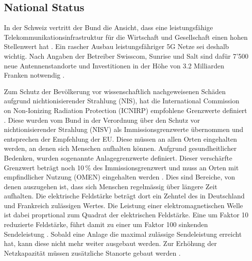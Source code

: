 \subsection{National Status}
\begin{German}
    In der Schweiz vertritt der Bund die Ansicht, dass eine leistungsfähige Telekommunikationsinfrastruktur für die Wirtschaft und Gesellschaft einen hohen Stellenwert hat \cite{bundesratNachhaltigesMobilfunknetzBericht2022}. Ein rascher Ausbau leistungsfähriger 5G Netze sei deshalb wichtig. Nach Angaben der Betreiber Swisscom, Sunrise und Salt sind dafür 7'500 neue Antennenstandorte und Investitionen in der Höhe von 3.2 Milliarden Franken notwendig \cite{bundesratNachhaltigesMobilfunknetzBericht2022}.

    Zum Schutz der Bevölkerung vor wissenschaftlich nachgeweisenen Schäden aufgrund nichtionisierender Strahlung (NIS), hat die International Commission on Non-Ionizing Radiation Protection (ICNIRP) empfohlene Grenzwerte definiert \cite{baumannMitVerordnungUeber2005}. Diese wurden vom Bund in der Verordnung über den Schutz vor nichtionisierender Strahlung (NISV) als Immissionsgrenzwerte übernommen und entsprechen der Empfehlung der EU. Diese müssen an allen Orten eingehalten werden, an denen sich Menschen aufhalten können. Aufgrund gesundheitlicher Bedenken, wurden sogenannte Anlagegrenzwerte definiert. Dieser verschärfte Grenzwert beträgt noch 10\,\% des Immissionsgrenzwert und muss an Orten mit empfindlicher Nutzung (OMEN) eingehalten werden \cite{baumannMitVerordnungUeber2005}. Dies sind Bereiche, von denen auszugehen ist, dass sich Menschen regelmässig über längere Zeit aufhalten. Die elektrische Feldstärke beträgt dort ein Zehntel des in Deutschland und Frankreich zulässigen Wertes. Die Leistung einer elektromagnetischen Welle ist dabei proprtional zum Quadrat der elektrischen Feldstärke. Eine um Faktor 10 reduzierte Feldstärke, führt damit zu einer um Faktor 100 sinkenden Sendeleistung \cite{chance5gAnlagegrenzwerteImMobilfunk}.
    Sobald eine Anlage die maximal zulässige Sendeleistung erreicht hat, kann diese nicht mehr weiter ausgebaut werden. Zur Erhöhung der Netzkapazität müssen zusätzliche Stanorte gebaut werden \cite{bundesratNachhaltigesMobilfunknetzBericht2022}.
\end{German}

